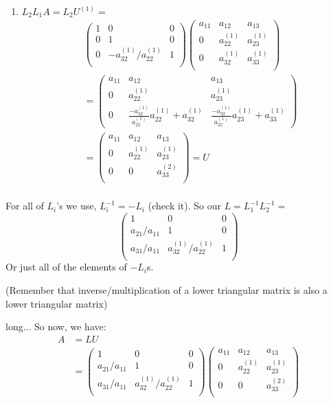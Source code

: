 \begin{enumerate}
\item $ L_2L_1A=L_2U^{(1)}=$  \begin{align*}
    &\begin{pmatrix}
  1 &  0&0\\
  0 & 1 & 0 \\
0&  -a_{32}^{(1)}/a_{22}^{(1)}& 1 \\
  \end{pmatrix}\begin{pmatrix}
  a_{11}&  a_{12}&  a_{13}\\
0& a_{22}^{(1)}&   a_{23}^{(1)}\\ 
0&  a_{32}^{(1)}&  a_{33}^{(1)}\\
\end{pmatrix}\\
&=\begin{pmatrix}
  a_{11}&  a_{12}&  a_{13}\\
0& a_{22}^{(1)}& a_{23}^{(1)}\\ 
0 & \frac{-a_{32}^{(1)}}{a_{22}^{(1)}}a_{22}^{(1)}+a_{32}^{(1)}& \frac{-a_{32}^{(1)}}{a_{22}^{(1)}}a_{23}^{(1)}+a_{33}^{(1)}
\end{pmatrix}\\
&=\begin{pmatrix}
  a_{11}&  a_{12}&  a_{13}\\
0& a_{22}^{(1)}& a_{23}^{(1)}\\ 
0&  0&  a_{33}^{(2)}\\
\end{pmatrix} = U\\
  \end{align*}
\end{enumerate}

For all of $L_i$'s we use, $L_i^{-1} = -L_i$ (check it). So our 
$L=L_1^{-1}L_2^{-1} =$
$$\begin{pmatrix}
  1&0&0\\
  a_{21}/a_{11}& 1 & 0\\
a_{31}/a_{11}& a_{32}^{(1)}/a_{22}^{(1)}& 1 \\
\end{pmatrix}
$$ Or just all of the elements of $-L_i$s.

(Remember that inverse/multiplication of a lower triangular matrix is also a lower
triangular matrix)

\noi
long... So now, we have:
\begin{align*}
A &= LU  \\
&=\begin{pmatrix}
  1&0&0\\
  a_{21}/a_{11}& 1 & 0\\
a_{31}/a_{11}& a_{32}^{(1)}/a_{22}^{(1)}& 1 \\
\end{pmatrix}\begin{pmatrix}
  a_{11}&  a_{12}&  a_{13}\\
0& a_{22}^{(1)}& a_{23}^{(1)}\\ 
0&  0&  a_{33}^{(2)}\\
\end{pmatrix}
\end{align*}

